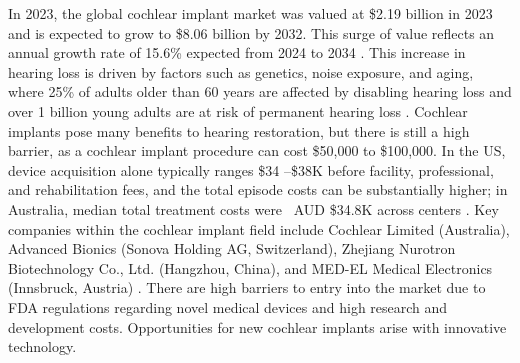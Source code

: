 \documentclass[referee,pdflatex, sn-vancouver-num]{sn-jnl}%
\theoremstyle{thmstyleone}%
\theoremstyle{thmstyletwo}%
\theoremstyle{thmstylethree}%
\DeclareRobustCommand{\textendash}{\ifmmode\text{-}\else\leavevmode\hbox{--}\fi}
\begin{document}
In 2023, the global cochlear implant market was valued at \$2.19 billion in 2023 and is expected to grow to \$8.06 billion by 2032. This surge of value reflects an annual growth rate of 15.6\% expected from 2024 to 2034 \cite{FBI_2025_CI_Global}. This increase in hearing loss is driven by factors such as genetics, noise exposure, and aging, where 25\% of adults older than 60 years are affected by disabling hearing loss and over 1 billion young adults are at risk of permanent hearing loss \cite{WHO2025, Zhao2022_BMJGH_UnsafeListening}. Cochlear implants pose many benefits to hearing restoration, but there is still a high barrier, as a cochlear implant procedure can cost \$50,000 to \$100,000. 
In the US, device acquisition alone typically ranges \$34 \textendash \$38K before facility, professional, and rehabilitation fees, and the total episode costs can be substantially higher; in Australia, median total treatment costs were ~AUD \$34.8K across centers \cite{Pillay2024_BMCHSR,Bartholomew2023_HealthAffairs}. Key companies within the cochlear implant field include Cochlear Limited (Australia), Advanced Bionics (Sonova Holding AG, Switzerland), Zhejiang Nurotron Biotechnology Co., Ltd. (Hangzhou, China), and MED-EL Medical Electronics (Innsbruck, Austria) \cite{GrandView_2024_CI_Global}.  There are high barriers to entry into the market due to FDA regulations regarding novel medical devices and high research and development costs. Opportunities for new cochlear implants arise with innovative technology.

\end{document}
